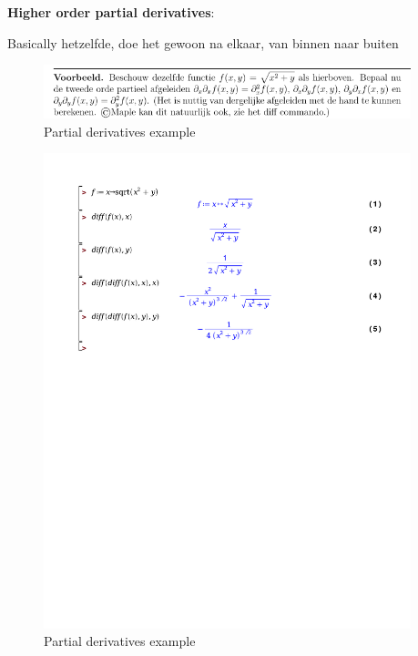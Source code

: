 \documentclass[a4paper]{report}
\begin{document}
\textbf{Higher order partial derivatives}:

Basically hetzelfde, doe het gewoon na elkaar, van binnen naar buiten

\begin{figure}[H]
	\begin{center}
		\includegraphics[width=0.95\textwidth]{./images/partial_2.png}
	\end{center}
	\caption{Partial derivatives example}
	\label{}
\end{figure}

\begin{figure}[H]
	\begin{center}
		\includegraphics[width=0.95\textwidth]{./partial_2.pdf}
	\end{center}
	\caption{Partial derivatives example}
	\label{}
\end{figure}
\end{document}
